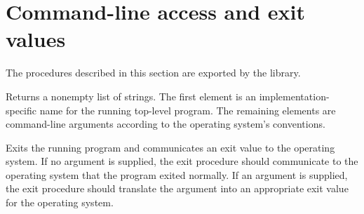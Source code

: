 \chapter{Command-line access and exit values}
\label{programlibchapter}

The procedures described in this section are exported by the
 library.

\begin{entry}{%
}

Returns a nonempty list of strings.
The first element is an implementation-specific
name for the running top-level program.  The remaining elements are command-line
arguments according to the operating system's conventions.
\end{entry}

\begin{entry}{%
}

Exits the running program and communicates an exit value to the 
operating system.  If no argument is supplied, the {\cf exit}
procedure should communicate to the operating system that the program 
exited normally.  If an argument is supplied, the {\cf exit} procedure 
should translate the argument into an appropriate exit value for the 
operating system.
\end{entry}

